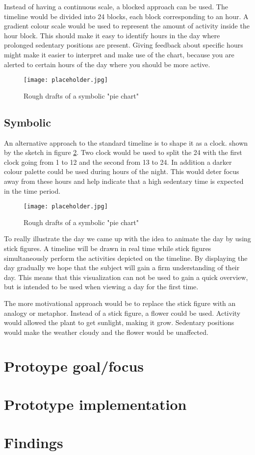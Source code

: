Instead of having a continuous scale, a blocked approach can be used. The timeline would be divided into 24 blocks, each block corresponding to an hour. A gradient colour scale would be used to represent the amount of activity inside the hour block. This should make it easy to identify hours in the day where prolonged sedentary positions are present. Giving feedback about specific hours might make it easier to interpret and make use of the chart, because you are alerted to certain hours of the day where you should be more active.

\begin{figure}[h!]
	\centering
		\texttt{[image: placeholder.jpg]}
		\caption{\footnotesize Rough drafts of a symbolic "pie chart"}
		\label{fig:simpleTimeline}
\end{figure}

\subsection{Symbolic}
An alternative approach to the standard timeline is to shape it as a clock. shown by the sketch in figure \ref{fig:clock}. Two clock would be used to split the 24 with the first clock going from 1 to 12 and the second from 13 to 24. 
In addition a darker colour palette could be used during hours of the night. This would deter focus away from these hours and help indicate that a high sedentary time is expected in the time period.

\begin{figure}[h!]
	\centering
		\texttt{[image: placeholder.jpg]}
		\caption{\footnotesize Rough drafts of a symbolic "pie chart"}
		\label{fig:clock}
\end{figure}
To really illustrate the day we came up with the idea to animate the day by using stick figures. A timeline will be drawn in real time while stick figures simultaneously perform the activities depicted on the timeline. By displaying the day gradually we hope that the subject will gain a firm understanding of their day. This means that this visualization can not be used to gain a quick overview, but is intended to be used when viewing a day for the first time.

The more motivational approach would be to replace the stick figure with an analogy or metaphor. Instead of a stick figure, a flower could be used. Activity would allowed the plant to get sunlight, making it grow. Sedentary positions would make the weather cloudy and the flower would be unaffected.

\section{Protoype goal/focus}

\section{Prototype implementation}

\section{Findings}
